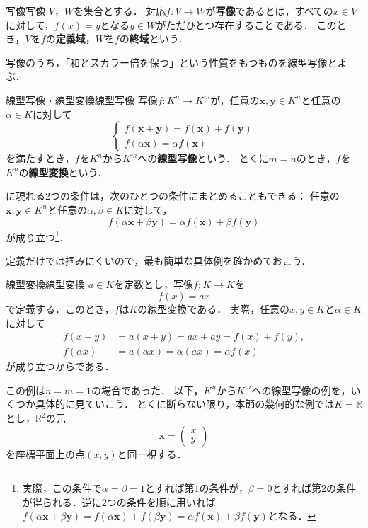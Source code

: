 \begin{definition}{写像}{写像}
  $V$，$W$を集合とする．
  対応$f \colon V \to W$が\textbf{写像}であるとは，すべての$x \in V$に対して，$f(x) = y$となる$y \in W$がただひとつ存在することである．
  このとき，$V$を$f$の\textbf{定義域}，$W$を$f$の\textbf{終域}という．
\end{definition}

写像のうち，「和とスカラー倍を保つ」という性質をもつものを線型写像とよぶ．

\begin{definition}{線型写像・線型変換}{線型写像}
  写像$f \colon K^n \to K^m$が，任意の$\bm{x}, \bm{y} \in K^n$と任意の$\alpha \in K$に対して
  \[
    \begin{cases}
      f(\bm{x} + \bm{y}) = f(\bm{x}) + f(\bm{y}) \\
      f(\alpha\bm{x}) = \alpha f(\bm{x})
    \end{cases}
  \]
  を満たすとき，$f$を$K^n$から$K^m$への\textbf{線型写像}という．
  とくに$m = n$のとき，$f$を$K^n$の\textbf{線型変換}という．
\end{definition}

に現れる$2$つの条件は，次のひとつの条件にまとめることもできる：
任意の$\bm{x}, \bm{y} \in K^n$と任意の$\alpha, \beta \in K$に対して，
\[
  f(\alpha\bm{x} + \beta\bm{y}) = \alpha f(\bm{x}) + \beta f(\bm{y})
\]
が成り立つ\footnote{実際，この条件で$\alpha = \beta = 1$とすれば第$1$の条件が，$\beta = 0$とすれば第$2$の条件が得られる．逆に$2$つの条件を順に用いれば$f(\alpha\bm{x} + \beta\bm{y}) = f(\alpha\bm{x}) + f(\beta\bm{y}) = \alpha f(\bm{x}) + \beta f(\bm{y})$となる．}．

定義だけでは掴みにくいので，最も簡単な具体例を確かめておこう．

\begin{example}{線型変換}{線型変換}
  $a \in K$を定数とし，写像$f \colon K \to K$を
  \[
    f(x) = ax
  \]
  で定義する．このとき，$f$は$K$の線型変換である．
  実際，任意の$x, y \in K$と$\alpha \in K$に対して
  \begin{align*}
    f(x + y) &= a(x + y) = ax + ay = f(x) + f(y), \\
    f(\alpha x) &= a(\alpha x) = \alpha(ax) = \alpha f(x)
  \end{align*}
  が成り立つからである．
\end{example}

この例は$n = m = 1$の場合であった．
以下，$K^n$から$K^m$への線型写像の例を，いくつか具体的に見ていこう．
とくに断らない限り，本節の幾何的な例では$K = \mathbb{R}$とし，$\mathbb{R}^2$の元
\[
  \bm{x} = \begin{pmatrix} x \\ y \end{pmatrix}
\]
を座標平面上の点$(x, y)$と同一視する．


